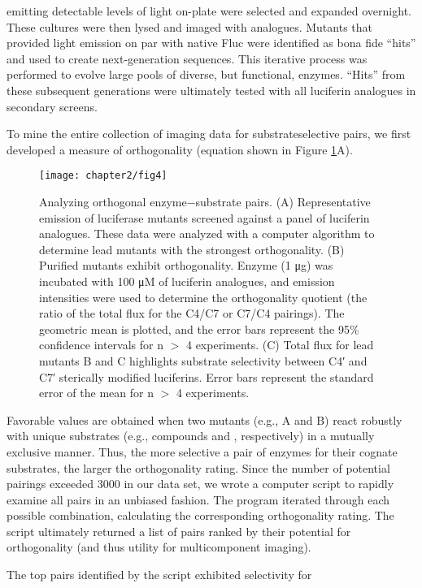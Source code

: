 emitting detectable levels of light on-plate were selected and
expanded overnight. These cultures were then lysed and
imaged with analogues. Mutants that provided light emission
on par with native Fluc were identified as bona fide “hits” and
used to create next-generation sequences. This iterative process
was performed to evolve large pools of diverse, but functional,
enzymes. “Hits” from these subsequent generations were
ultimately tested with all luciferin analogues in secondary
screens.
\par
To mine the entire collection of imaging data for substrateselective
pairs, we first developed a measure of orthogonality
(equation shown in Figure \ref{fig:mining_verifying}A).
\begin{figure}[htbp]
\texttt{[image: chapter2/fig4]}
\centering
\caption[Analyzing orthogonal enzyme−substrate pairs]{Analyzing orthogonal enzyme−substrate pairs. (A) Representative emission of luciferase mutants screened against a panel of luciferin
analogues. These data were analyzed with a computer algorithm to determine lead mutants with the strongest orthogonality. (B) Purified mutants
exhibit orthogonality. Enzyme (1 μg) was incubated with 100 μM of luciferin analogues, and emission intensities were used to determine the
orthogonality quotient (the ratio of the total flux for the C4/C7 or C7/C4 pairings). The geometric mean is plotted, and the error bars represent the
95\% confidence intervals for n $>$ 4 experiments. (C) Total flux for lead mutants B and C highlights substrate selectivity between C4′ and C7′
sterically modified luciferins. Error bars represent the standard error of the mean for n $>$ 4 experiments.}
  \label{fig:mining_verifying}
\end{figure}
Favorable values are obtained
when two mutants (e.g., A and B) react robustly with unique
substrates (e.g., compounds  and , respectively) in a mutually
exclusive manner. Thus, the more selective a pair of enzymes
for their cognate substrates, the larger the orthogonality rating.
Since the number of potential pairings exceeded 3000 in our
data set, we wrote a computer script to rapidly examine all pairs
in an unbiased fashion. The program iterated through each
possible combination, calculating the corresponding orthogonality
rating. The script ultimately returned a list of pairs ranked
by their potential for orthogonality (and thus utility for
multicomponent imaging).
\par
The top pairs identified by the script exhibited selectivity for
